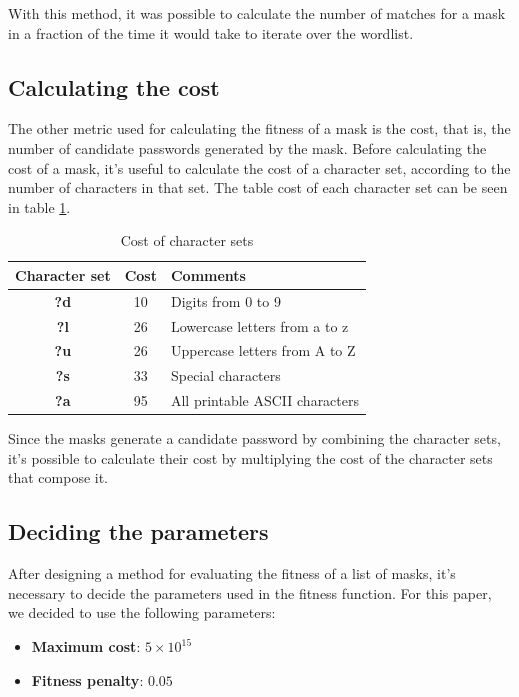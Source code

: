 \documentclass[sigconf,authordraft]{acmart}
\begin{document}
With this method, it was possible to calculate the number of matches for a mask in a fraction of the time it would take to iterate over the wordlist.

\subsection{Calculating the cost}

The other metric used for calculating the fitness of a mask is the cost, that is, the number of candidate passwords generated by the mask.
Before calculating the cost of a mask, it's useful to calculate the cost of a character set, according to the number of characters in that set.
The table cost of each character set can be seen in table \ref{tab:cost}.

\begin{table}
  \caption{Cost of character sets}
  \label{tab:cost}
  \begin{tabular}{ccl}
    \toprule
    Character set & Cost & Comments\\
    \midrule
    \textbf{?d} & 10 & Digits from 0 to 9\\
    \textbf{?l} & 26 & Lowercase letters from a to z\\
    \textbf{?u} & 26 & Uppercase letters from A to Z\\
    \textbf{?s} & 33 & Special characters\\
    \textbf{?a} & 95 & All printable ASCII characters\\
    \bottomrule
  \end{tabular}
\end{table}

Since the masks generate a candidate password by combining the character sets, it's possible to calculate their cost by multiplying the cost of the character sets that compose it.

\subsection{Deciding the parameters}
\label{sec:deciding_parameters}

After designing a method for evaluating the fitness of a list of masks, it's necessary to decide the parameters used in the fitness function.
For this paper, we decided to use the following parameters:

\begin{itemize}
  \item \textbf{Maximum cost}: $5 \times 10^{15}$
  \item \textbf{Fitness penalty}: $0.05$
\end{itemize}
\end{document}
